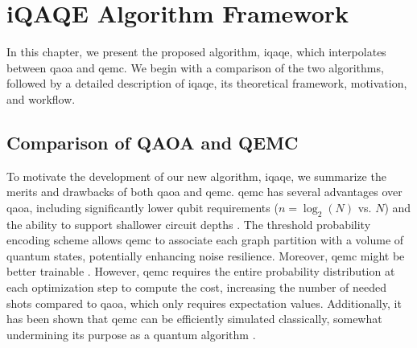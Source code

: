 
\chapter{iQAQE Algorithm Framework}
\label{chapter:Base Algorithm}


In this chapter, we present the proposed algorithm, \acrshort{iqaqe}, which interpolates between \acrshort{qaoa} and \acrshort{qemc}. We begin with a comparison of the two algorithms, followed by a detailed description of \acrshort{iqaqe}, its theoretical framework, motivation, and workflow.

\section{Comparison of QAOA and QEMC}
To motivate the development of our new algorithm, \acrshort{iqaqe}, we summarize the merits and drawbacks of both \acrshort{qaoa} and \acrshort{qemc}. \acrshort{qemc} has several advantages over \acrshort{qaoa}, including significantly lower qubit requirements ($n = \log_2(N)$ vs. $N$) and the ability to support shallower circuit depths \cite{tenecohen2023variational}. The threshold probability encoding scheme allows \acrshort{qemc} to associate each graph partition with a volume of quantum states, potentially enhancing noise resilience. Moreover, \acrshort{qemc} might be better trainable \cite{tenecohen2023variational}. However, \acrshort{qemc} requires the entire probability distribution at each optimization step to compute the cost, increasing the number of needed shots compared to \acrshort{qaoa}, which only requires expectation values. Additionally, it has been shown that \acrshort{qemc} can be efficiently simulated classically, somewhat undermining its purpose as a quantum algorithm \cite{tenecohen2023variational}.

